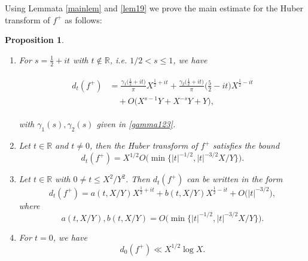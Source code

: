 \documentclass[a4paper,11pt]{amsart}
\newtheorem{proposition}[theorem]{Proposition}
\theoremstyle{definition}
\begin{document}
Using Lemmata \ref{mainlem} and \ref{lem19} we prove the main estimate for the Huber transform of $f^{+}$ as follows: \begin{proposition}\label{mainprop}
\begin{enumerate}
   \item[(i)] For $s=\frac{1}{2}+it$ with $t\notin \mathbb{R}$, i.e. $1/2<s\le1$, we have 

\begin{align}
    \begin{split}
        d_t(f^{+})&=\frac{\gamma_1\big(\frac{1}{2}+it\big)}{\pi}X^{\frac{1}{2}+it}+\frac{\gamma_2\big(\frac{1}{2}+it\big)}{\pi}\Big(\frac{5}{2}-it\Big)X^{\frac{1}{2}-it} \\
        &\quad+O\Big(X^{s-1}Y+X^{-s}Y+Y\big),
    \end{split}
\end{align}
    
    with $\gamma_1(s),\gamma_2(s)$ given in \eqref{gamma123}.
    \item[(ii)] Let $t\in \mathbb{R}$ and $t\neq 0$, then the Huber transform of $f^{+}$ satisfies the bound
    $$d_t(f^{+})=X^{1/2}O\big(\min \{|t|^{-1/2},|t|^{-3/2}X/Y\}\big).$$
    \item[(iii)] Let $t\in \mathbb{R}$ with $0\neq t \le X^2/Y^2$. Then $d_t(f^{+})$ can be written in the form
    $$ d_t(f^{+})= a(t,X/Y)X^{\frac{1}{2}+it}+b(t,X/Y)X^{\frac{1}{2}-it}+O\big(|t|^{-3/2}\big),$$ where $$a(t,X/Y),b(t,X/Y)=O\big(\min\{|t|^{-1/2},|t|^{-3/2}X/Y\}\big).$$
   
    \item[(iv)] For $t=0$, we have $$d_0(f^{+}) \ll X^{1/2}\log X.$$
\end{enumerate}
\end{proposition}
\end{document}
